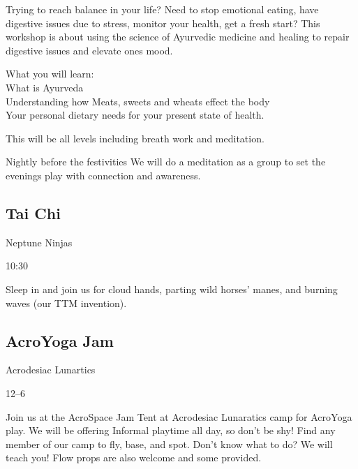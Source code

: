 \begin{multicols}{2}
Trying to reach balance in your life? Need to stop emotional eating, have digestive issues due to stress, monitor your health, get a fresh start?
This workshop is about using the science of Ayurvedic medicine and healing to repair digestive issues and elevate ones mood.

What you will learn:\\
What is Ayurveda\\
Understanding how Meats, sweets and wheats effect the body\\
Your personal dietary needs for your present state of health. 

This will be all levels including breath work and meditation.

Nightly before the festivities We will do a meditation as a group to set the evenings play with connection and awareness.

\subsection*{Tai Chi}
\begin{description}[leftmargin=6em,noitemsep,style=nextline]
	\item[Camp:] Neptune Ninjas
  \item[Times:] 10:30\am
\end{description}

Sleep in and join us for cloud hands, parting wild horses’ manes, and burning waves (our TTM invention). 

\subsection*{AcroYoga Jam}
\begin{description}[leftmargin=6em,noitemsep,style=nextline]
	\item[Camp:] Acrodesiac Lunartics
  \item[Times:] 12--6\pm
\end{description}

Join us at the AcroSpace Jam Tent at Acrodesiac Lunaratics camp for AcroYoga play. We will be offering Informal playtime all day, so don't be shy! Find any member of our camp to fly, base, and spot. Don't know what to do? We will teach you! Flow props are also  welcome and some provided.


\end{multicols}
